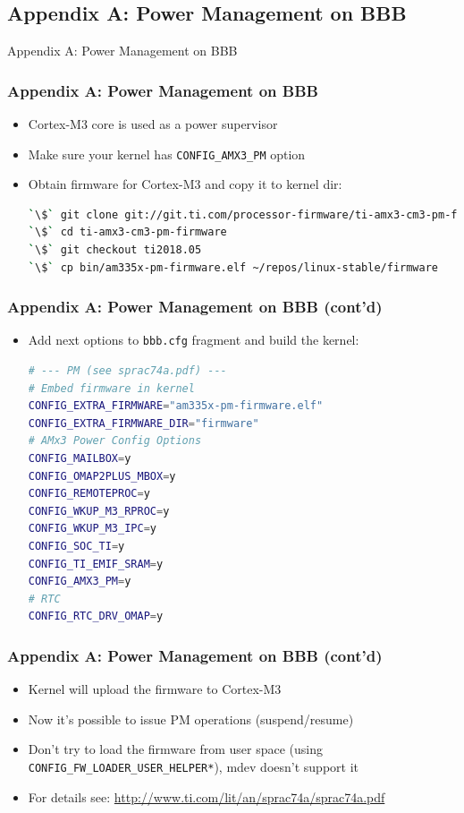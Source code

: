 \subsection{Appendix A: Power Management on BBB}

\begin{frame}[standout]
  Appendix A: Power Management on BBB
\end{frame}

\begin{frame}[containsverbatim]
  \frametitle{Appendix A: Power Management on BBB}
  \begin{itemize}
    \item Cortex-M3 core is used as a power supervisor
    \item Make sure your kernel has \texttt{CONFIG\_AMX3\_PM} option
    \item Obtain firmware for Cortex-M3 and copy it to kernel dir:
      \begin{lstlisting}[language=bash,numbers=none]
`\$` git clone git://git.ti.com/processor-firmware/ti-amx3-cm3-pm-firmware.git
`\$` cd ti-amx3-cm3-pm-firmware
`\$` git checkout ti2018.05
`\$` cp bin/am335x-pm-firmware.elf ~/repos/linux-stable/firmware
      \end{lstlisting}
  \end{itemize}
\end{frame}

\begin{frame}[containsverbatim]
  \frametitle{Appendix A: Power Management on BBB (cont'd)}
  \begin{itemize}
    \item Add next options to \texttt{bbb.cfg} fragment and build the kernel:
      \begin{lstlisting}[language=bash,numbers=none]
# --- PM (see sprac74a.pdf) ---
# Embed firmware in kernel
CONFIG_EXTRA_FIRMWARE="am335x-pm-firmware.elf"
CONFIG_EXTRA_FIRMWARE_DIR="firmware"
# AMx3 Power Config Options
CONFIG_MAILBOX=y
CONFIG_OMAP2PLUS_MBOX=y
CONFIG_REMOTEPROC=y
CONFIG_WKUP_M3_RPROC=y
CONFIG_WKUP_M3_IPC=y
CONFIG_SOC_TI=y
CONFIG_TI_EMIF_SRAM=y
CONFIG_AMX3_PM=y
# RTC
CONFIG_RTC_DRV_OMAP=y
      \end{lstlisting}
  \end{itemize}
\end{frame}

\begin{frame}[containsverbatim]
  \frametitle{Appendix A: Power Management on BBB (cont'd)}
  \begin{itemize}
    \item Kernel will upload the firmware to Cortex-M3
    \item Now it's possible to issue PM operations (suspend/resume)
    \item Don't try to load the firmware from user space (using
          \texttt{CONFIG\_FW\_LOADER\_USER\_HELPER*}), mdev doesn't support it
    \item For details see:
          \url{http://www.ti.com/lit/an/sprac74a/sprac74a.pdf}
  \end{itemize}
\end{frame}

